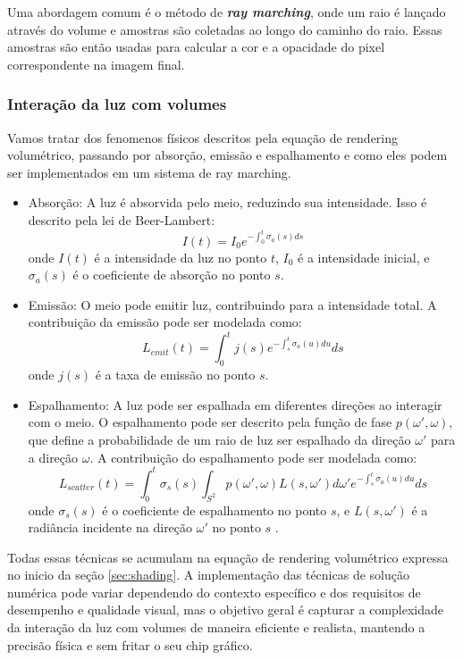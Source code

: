 Uma abordagem comum é o método de \textbf{\textit{ray marching}}, onde um raio é lançado através do volume e amostras são coletadas ao longo do caminho do raio. Essas amostras são então usadas para calcular a cor e a opacidade do pixel correspondente na imagem final.

\subsubsection{Interação da luz com volumes}

Vamos tratar dos fenomenos físicos descritos pela equação de rendering volumétrico, passando por absorção, emissão e espalhamento e como eles podem ser implementados em um sistema de ray marching.

\begin{itemize}
  \item Absorção: A luz é absorvida pelo meio, reduzindo sua intensidade. Isso é descrito pela lei de Beer-Lambert:
  $$
  I(t) = I_0 e^{-\int_{0}^{t} \sigma_a(s) ds}
  $$
  onde $I(t)$ é a intensidade da luz no ponto $t$, $I_0$ é a intensidade inicial, e $\sigma_a(s)$ é o coeficiente de absorção no ponto $s$.
  
  \item Emissão: O meio pode emitir luz, contribuindo para a intensidade total. A contribuição da emissão pode ser modelada como:
  $$
  L_{emit}(t) = \int_{0}^{t} j(s) e^{-\int_{s}^{t} \sigma_a(u) du} ds
  $$
  onde $j(s)$ é a taxa de emissão no ponto $s$.
  
  \item Espalhamento: A luz pode ser espalhada em diferentes direções ao interagir com o meio. O espalhamento pode ser descrito pela função de fase $p(\omega', \omega)$, que define a probabilidade de um raio de luz ser espalhado da direção $\omega'$ para a direção $\omega$. A contribuição do espalhamento pode ser modelada como:
  $$
  L_{scatter}(t) = \int_{0}^{t} \sigma_s(s) \int_{S^2} p(\omega', \omega) L(s, \omega') d\omega' e^{-\int_{s}^{t} \sigma_a(u) du} ds
  $$
  onde $\sigma_s(s)$ é o coeficiente de espalhamento no ponto $s$, e $L(s, \omega')$ é a radiância incidente na direção $\omega'$ no ponto $s$ \cite{Kajiya1984}.
\end{itemize}

Todas essas técnicas se acumulam na equação de rendering volumétrico expressa no inicio da seção \ref{sec:shading}. A implementação das técnicas de solução numérica pode variar dependendo do contexto específico e dos requisitos de desempenho e qualidade visual, mas o objetivo geral é capturar a complexidade da interação da luz com volumes de maneira eficiente e realista, mantendo a precisão física e sem fritar o seu chip gráfico.

